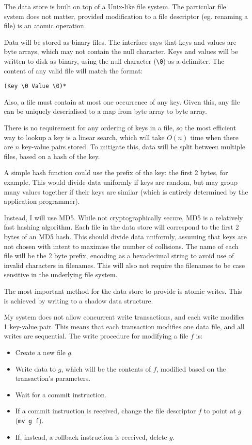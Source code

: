 \documentclass[12pt,a4paper,twoside,openright]{report}
\begin{document}
The data store is built on top of a Unix-like file system. The particular file system does not matter, provided modification to a file descriptor (eg. renaming a file) is an atomic operation.

Data will be stored as binary files. The interface says that keys and values are byte arrays, which may not contain the null character. Keys and values will be written to disk as binary, using the null character (\verb|\0|) as a delimiter. The content of any valid file will match the format:

\verb|(Key \0 Value \0)*|

Also, a file must contain at most one occurrence of any key. Given this, any file can be uniquely deserialised to a map from byte array to byte array.

There is no requirement for any ordering of keys in a file, so the most efficient way to lookup a key is a linear search, which will take $O(n)$ time when there are $n$ key-value pairs stored. To mitigate this, data will be split between multiple files, based on a hash of the key.

A simple hash function could use the prefix of the key: the first 2 bytes, for example. This would divide data uniformly if keys are random, but may group many values together if their keys are similar (which is entirely determined by the application programmer).

Instead, I will use MD5. While not cryptographically secure, MD5 is a relatively fast hashing algorithm. Each file in the data store will correspond to the first 2 bytes of an MD5 hash. This should divide data uniformly, assuming that keys are not chosen with intent to maximise the number of collisions. The name of each file will be the 2 byte prefix, encoding as a hexadecimal string to avoid use of invalid characters in filenames. This will also not require the filenames to be case sensitive in the underlying file system.

The most important method for the data store to provide is atomic writes. This is achieved by writing to a shadow data structure.

My system does not allow concurrent write transactions, and each write modifies 1 key-value pair. This means that each transaction modifies one data file, and all writes are sequential. The write procedure for modifying a file $f$ is:

\begin{itemize}
\item
Create a new file $g$.

\item
Write data to $g$, which will be the contents of $f$, modified based on the transaction's parameters.

\item
Wait for a commit instruction.

\item
If a commit instruction is received, change the file descriptor $f$ to point at $g$ (\verb|mv g f|).

\item
If, instead, a rollback instruction is received, delete $g$.

\end{itemize}
\end{document}
